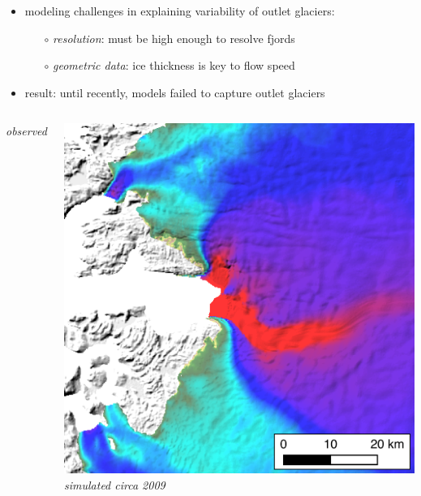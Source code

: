 \documentclass[hide notes,intlimits]{beamer}
\begin{document}
\begin{frame}[plain]

\begin{itemize}
\item modeling challenges in explaining variability of outlet glaciers:
      \begin{itemize}
      \item[$\circ$] \emph{resolution}:  must be high enough to resolve fjords
      \item[$\circ$] \emph{geometric data}: ice thickness is key to flow speed
      \end{itemize}
\item result: until recently, models failed to capture outlet glaciers
\end{itemize}

  \begin{columns}
    \column[c]{5cm}
    \emph{observed}

\medskip
    \includegraphics[width=\textwidth]{jakobshavn-obs-nogate}
    \column[c]{5cm}
    \emph{simulated circa 2009}


\end{columns}
\end{frame}
\end{document}
